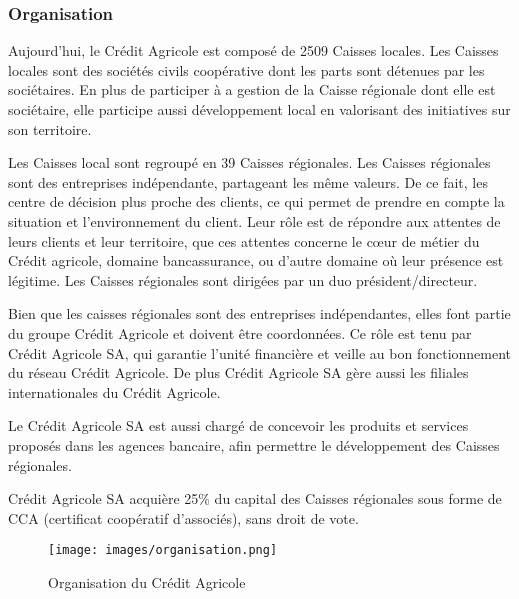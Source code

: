 \documentclass[12pt,a4paper]{article}
\begin{document}
\subsubsection{Organisation}
Aujourd'hui, le Crédit Agricole est composé de 2509 Caisses locales. Les Caisses locales sont des sociétés civils coopérative dont les parts sont détenues par les sociétaires. En plus de participer à a gestion de la Caisse régionale dont elle est sociétaire, elle participe aussi développement local en valorisant des initiatives sur son territoire.\par 
\medskip
Les Caisses local sont regroupé en 39 Caisses régionales. Les Caisses régionales sont des entreprises indépendante, partageant les même valeurs. De ce fait, les centre de décision plus proche des clients, ce qui permet de prendre en compte la situation et l'environnement du client. Leur rôle est de répondre aux attentes de leurs clients et leur territoire, que ces attentes concerne le cœur de métier du Crédit agricole, domaine bancassurance, ou d'autre domaine où leur présence est légitime. Les Caisses régionales sont dirigées par un duo président/directeur. \par 
\medskip
Bien que les caisses régionales sont des entreprises indépendantes, elles font partie du groupe Crédit Agricole et doivent être coordonnées. Ce rôle est tenu par Crédit Agricole SA, qui garantie l'unité financière et veille au bon fonctionnement du réseau Crédit Agricole. De plus Crédit Agricole SA gère aussi les filiales internationales du Crédit Agricole.\par 
Le Crédit Agricole SA est aussi chargé de concevoir les produits et services proposés dans les agences bancaire, afin permettre le développement des Caisses régionales.\par
Crédit Agricole SA acquière 25\% du capital des Caisses régionales sous forme de CCA (certificat coopératif d'associés), sans droit de vote.

\begin{figure}[h!]
\centering
\texttt{[image: images/organisation.png]}
\caption{Organisation du Crédit Agricole}
\end{figure}

\newpage
\end{document}
